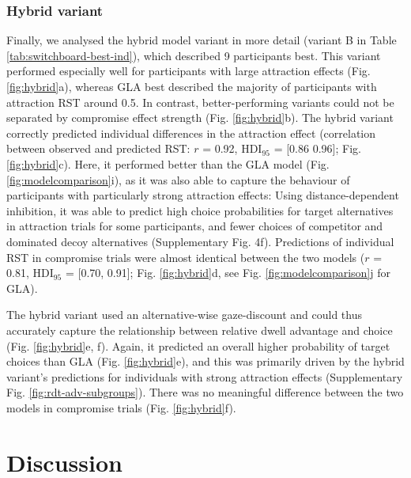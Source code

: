 \documentclass[11pt, a4paper]{article}
\begin{document}
\subsubsection*{Hybrid variant}

Finally, we analysed the hybrid model variant in more detail (variant B in Table \ref{tab:switchboard-best-ind}), which described 9 participants best. This variant performed especially well for participants with large attraction effects (Fig. \ref{fig:hybrid}a), whereas GLA best described the majority of participants with attraction RST around 0.5. In contrast, better-performing variants could not be separated by compromise effect strength (Fig. \ref{fig:hybrid}b). The hybrid variant correctly predicted individual differences in the attraction effect (correlation between observed and predicted RST: $r$ = 0.92, HDI$_{95}$ = [0.86 0.96]; Fig. \ref{fig:hybrid}c). Here, it performed better than the GLA model (Fig. \ref{fig:modelcomparison}i), as it was also able to capture the behaviour of participants with particularly strong attraction effects: Using distance-dependent inhibition, it was able to predict high choice probabilities for target alternatives in attraction trials for some participants, and fewer choices of competitor and dominated decoy alternatives (Supplementary Fig. 4f). Predictions of individual RST in compromise trials were almost identical between the two models ($r$ = 0.81, HDI$_{95}$ = [0.70, 0.91]; Fig. \ref{fig:hybrid}d, see Fig. \ref{fig:modelcomparison}j for GLA). 

The hybrid variant used an alternative-wise gaze-discount and could thus accurately capture the relationship between relative dwell advantage and choice (Fig. \ref{fig:hybrid}e, f). Again, it predicted an overall higher probability of target choices than GLA (Fig. \ref{fig:hybrid}e), and this was primarily driven by the hybrid variant’s predictions for individuals with strong attraction effects (Supplementary Fig. \ref{fig:rdt-adv-subgroups}). There was no meaningful difference between the two models in compromise trials (Fig. \ref{fig:hybrid}f).

\section*{Discussion}
\end{document}
